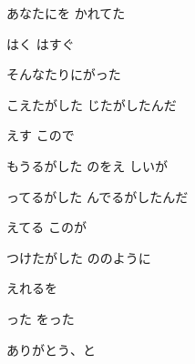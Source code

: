 \documentclass[14pt]{ltjsarticle}
\begin{document}
{  あなたにを かれてた
  \jisho{}

  はく はすぐ
  \jisho{}

  そんなたりにがった
  \jisho{}

\item
  こえたがした じたがしたんだ
  \jisho{}

  えす こので
  \jisho{}

  もうるがした のをえ しいが
  \jisho{}

  ってるがした んでるがしたんだ
  \jisho{}

  えてる このが
  \jisho{}

  つけたがした ののように
  \jisho{}

  えれるを
  \jisho{}

  った をった
  \jisho{}

  ありがとう、と
  \jisho{}

  
}
\end{document}
